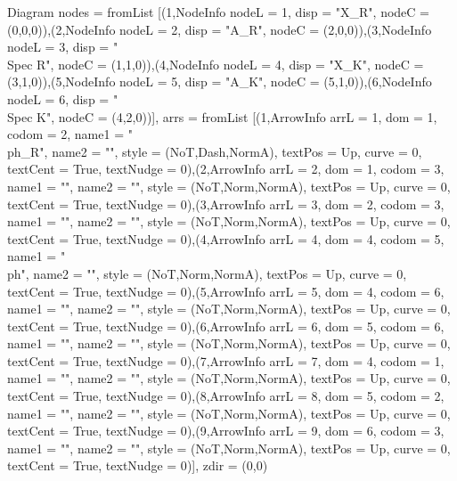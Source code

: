 Diagram {nodes = fromList [(1,NodeInfo {nodeL = 1, disp = "X_R", nodeC = (0,0,0)}),(2,NodeInfo {nodeL = 2, disp = "A_R", nodeC = (2,0,0)}),(3,NodeInfo {nodeL = 3, disp = "\\Spec R", nodeC = (1,1,0)}),(4,NodeInfo {nodeL = 4, disp = "X_K", nodeC = (3,1,0)}),(5,NodeInfo {nodeL = 5, disp = "A_K", nodeC = (5,1,0)}),(6,NodeInfo {nodeL = 6, disp = "\\Spec K", nodeC = (4,2,0)})], arrs = fromList [(1,ArrowInfo {arrL = 1, dom = 1, codom = 2, name1 = "\\ph_R", name2 = "", style = (NoT,Dash,NormA), textPos = Up, curve = 0, textCent = True, textNudge = 0}),(2,ArrowInfo {arrL = 2, dom = 1, codom = 3, name1 = "", name2 = "", style = (NoT,Norm,NormA), textPos = Up, curve = 0, textCent = True, textNudge = 0}),(3,ArrowInfo {arrL = 3, dom = 2, codom = 3, name1 = "", name2 = "", style = (NoT,Norm,NormA), textPos = Up, curve = 0, textCent = True, textNudge = 0}),(4,ArrowInfo {arrL = 4, dom = 4, codom = 5, name1 = "\\ph", name2 = "", style = (NoT,Norm,NormA), textPos = Up, curve = 0, textCent = True, textNudge = 0}),(5,ArrowInfo {arrL = 5, dom = 4, codom = 6, name1 = "", name2 = "", style = (NoT,Norm,NormA), textPos = Up, curve = 0, textCent = True, textNudge = 0}),(6,ArrowInfo {arrL = 6, dom = 5, codom = 6, name1 = "", name2 = "", style = (NoT,Norm,NormA), textPos = Up, curve = 0, textCent = True, textNudge = 0}),(7,ArrowInfo {arrL = 7, dom = 4, codom = 1, name1 = "", name2 = "", style = (NoT,Norm,NormA), textPos = Up, curve = 0, textCent = True, textNudge = 0}),(8,ArrowInfo {arrL = 8, dom = 5, codom = 2, name1 = "", name2 = "", style = (NoT,Norm,NormA), textPos = Up, curve = 0, textCent = True, textNudge = 0}),(9,ArrowInfo {arrL = 9, dom = 6, codom = 3, name1 = "", name2 = "", style = (NoT,Norm,NormA), textPos = Up, curve = 0, textCent = True, textNudge = 0})], zdir = (0,0)}
